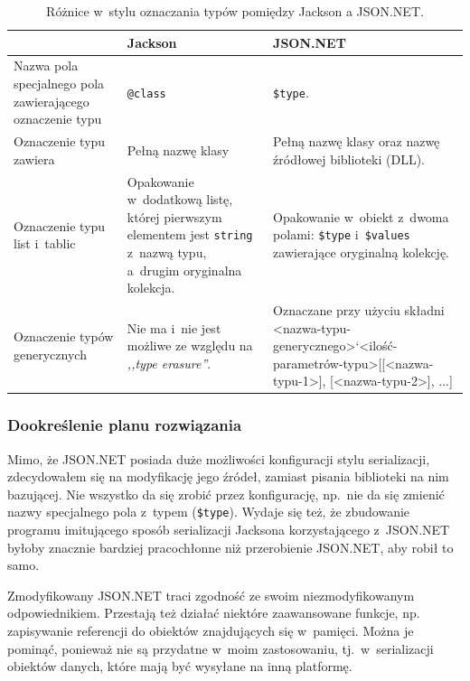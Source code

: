 \begin{table}[htbp]
	\centering
		\begin{tabular}{ | p{} || p{} | p{} | }
			\hline
				& \textbf{Jackson} & \textbf{JSON.NET} \\
				\hline \hline
				Nazwa pola specjalnego pola zawierającego oznaczenie typu & \texttt{@class} & \texttt{\$type}. \\
				\hline
				Oznaczenie typu zawiera & Pełną nazwę klasy & Pełną nazwę klasy oraz nazwę źródłowej biblioteki (DLL). \\
				\hline
				Oznaczenie typu list i~tablic & Opakowanie w~dodatkową listę, której pierwszym elementem jest \texttt{string} z~nazwą typu, a~drugim oryginalna kolekcja. & Opakowanie w~obiekt z~dwoma polami: \texttt{\$type} i~\texttt{\$values} zawierające oryginalną kolekcję. \\
				\hline
				Oznaczenie typów generycznych & Nie ma i~nie jest możliwe ze względu na \emph{,,type erasure''}. & Oznaczane przy użyciu składni <nazwa-typu-generycznego>`<ilość-parametrów-typu>[[<nazwa-typu-1>], [<nazwa-typu-2>], ...] \\
				\hline
		\end{tabular}
	\caption{Różnice w~stylu oznaczania typów pomiędzy Jackson a JSON.NET.}
	\label{tab:jackson-jsonnet-differences}
\end{table}

\subsubsection{Dookreślenie planu rozwiązania}
Mimo, że JSON.NET posiada duże możliwości konfiguracji stylu serializacji, zdecydowałem się na modyfikację jego źródeł, zamiast pisania biblioteki na nim bazującej. Nie wszystko da się zrobić przez konfigurację, np.\ nie da się zmienić nazwy specjalnego pola z~typem (\texttt{\$type}).
Wydaje się też, że zbudowanie programu imitującego sposób serializacji Jacksona korzystającego z~JSON.NET byłoby znacznie bardziej pracochłonne niż przerobienie JSON.NET, aby robił to samo.

Zmodyfikowany JSON.NET traci zgodność ze swoim niezmodyfikowanym odpowiednikiem.
Przestają też działać niektóre zaawansowane funkcje, np. zapisywanie referencji do obiektów znajdujących się w~pamięci.
Można je pominąć, ponieważ nie są przydatne w~moim zastosowaniu, tj.\ w~serializacji obiektów danych, które mają być wysyłane na inną platformę.

